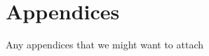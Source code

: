 \documentclass[11pt,a4paper,oldfontcommands]{memoir}
\begin{document}
																																																																																			   \appendix

																																																																																			   \chapter{Appendices}
																																																																																			   Any appendices that we might want to attach


																																																																																			   
																																																																																			   

																																																																																			   
\end{document}
